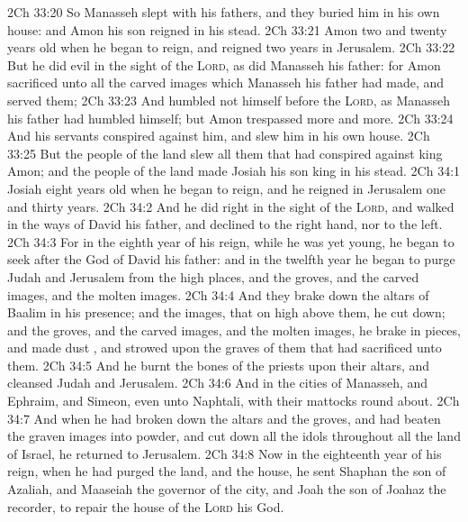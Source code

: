 \vs 2Ch 33:20 So Manasseh slept with his fathers, and they buried him in his own house: and Amon his son reigned in his stead.
\vs 2Ch 33:21 Amon  two and twenty years old when he began to reign, and reigned two years in Jerusalem.
\vs 2Ch 33:22 But he did  evil in the sight of the \textsc{Lord}, as did Manasseh his father: for Amon sacrificed unto all the carved images which Manasseh his father had made, and served them;
\vs 2Ch 33:23 And humbled not himself before the \textsc{Lord}, as Manasseh his father had humbled himself; but Amon trespassed more and more.
\vs 2Ch 33:24 And his servants conspired against him, and slew him in his own house.
\vs 2Ch 33:25 But the people of the land slew all them that had conspired against king Amon; and the people of the land made Josiah his son king in his stead.
\vs 2Ch 34:1 Josiah  eight years old when he began to reign, and he reigned in Jerusalem one and thirty years.
\vs 2Ch 34:2 And he did  right in the sight of the \textsc{Lord}, and walked in the ways of David his father, and declined  to the right hand, nor to the left.
\vs 2Ch 34:3 For in the eighth year of his reign, while he was yet young, he began to seek after the God of David his father: and in the twelfth year he began to purge Judah and Jerusalem from the high places, and the groves, and the carved images, and the molten images.
\vs 2Ch 34:4 And they brake down the altars of Baalim in his presence; and the images, that  on high above them, he cut down; and the groves, and the carved images, and the molten images, he brake in pieces, and made dust , and strowed  upon the graves of them that had sacrificed unto them.
\vs 2Ch 34:5 And he burnt the bones of the priests upon their altars, and cleansed Judah and Jerusalem.
\vs 2Ch 34:6 And  in the cities of Manasseh, and Ephraim, and Simeon, even unto Naphtali, with their mattocks round about.
\vs 2Ch 34:7 And when he had broken down the altars and the groves, and had beaten the graven images into powder, and cut down all the idols throughout all the land of Israel, he returned to Jerusalem.
\vs 2Ch 34:8 Now in the eighteenth year of his reign, when he had purged the land, and the house, he sent Shaphan the son of Azaliah, and Maaseiah the governor of the city, and Joah the son of Joahaz the recorder, to repair the house of the \textsc{Lord} his God.
